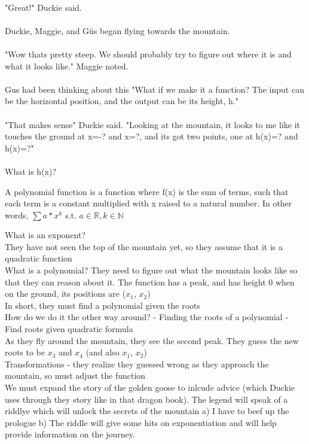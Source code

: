 \paragraph{} "Great!" Duckie said. 
\vfill
\pagebreak
{}
{\paragraph{} Duckie, Maggie, and G{\"u}s began flying towards the mountain. 
\paragraph{} "Wow thats pretty steep. We should probably try to figure out where it is and what it looks like." Maggie noted. 
\paragraph{} Gus had been thinking about this "What if we make it a function? The input can be the horizontal position, and the output can be its height, h."
\paragraph{} "That makes sense" Duckie said. "Looking at the mountain, it looks to me like it touches the ground at x=-? and x=?, and its got two points, one at h(x)=? and h(x)=?" 
\paragraph{} What is h(x)?}
{}
{A polynomial function is a function where f(x) is the sum of terms, such that each term is a constant multiplied with x raised to a natural number. In other words, $\sum a*x^{k}$ s.t. $a \in \mathbb{R}, k \in \mathbb{N}$}
{}

What is an exponent?\\
They have not seen the top of the mountain yet, so they assume that it is a quadratic function\\
What is a polynomial? They need to figure out what the mountain looks like so that they can reason about it. The function has a peak, and has height 0 when on the ground, its positions are ($x_1$, $x_2$)\\
\indent In short, they must find a polynomial given the roots \\
How do we do it the other way around? - Finding the roots of a polynomial - Find roots given quadratic formula\\
As they fly around the mountain, they see the second peak. They guess the new roots to be $x_3$ and $x_4$ (and also $x_1$, $x_2$)\\
Transformations - they realize they guessed wrong as they approach the mountain, so must adjust the function\\
We must expand the story of the golden goose to inlcude advice (which Duckie uses through they story like in that dragon book). The legend will speak of a riddlye which will unlock the secrets of the mountain a)  I have to beef up the prologue b) The riddle will give some hits on exponentiation and will help provide information on the journey.
\pagebreak